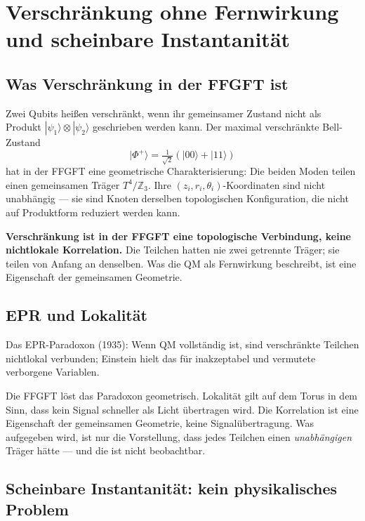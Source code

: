 \chapter{Verschränkung ohne Fernwirkung und scheinbare Instantanität}
\label{ch:verschraenkung}

\section{Was Verschränkung in der FFGFT ist}

Zwei Qubits heißen verschränkt, wenn ihr gemeinsamer Zustand nicht als
Produkt $|\psi_1\rangle\otimes|\psi_2\rangle$ geschrieben werden kann.
Der maximal verschränkte Bell-Zustand
\begin{equation}
  |\Phi^+\rangle = \tfrac{1}{\sqrt2}(|00\rangle+|11\rangle)
\end{equation}
hat in der FFGFT eine geometrische Charakterisierung: Die beiden Moden
teilen einen gemeinsamen Träger $T^4/\mathbb{Z}_3$. Ihre
$(z_i,r_i,\theta_i)$-Koordinaten sind nicht unabhängig --- sie sind
Knoten derselben topologischen Konfiguration, die nicht auf Produktform
reduziert werden kann.

\textbf{Verschränkung ist in der FFGFT eine topologische Verbindung,
keine nichtlokale Korrelation.} Die Teilchen hatten nie zwei getrennte
Träger; sie teilen von Anfang an denselben. Was die QM als Fernwirkung
beschreibt, ist eine Eigenschaft der gemeinsamen Geometrie.

\section{EPR und Lokalität}

Das EPR-Paradoxon (1935): Wenn QM vollständig ist, sind verschränkte
Teilchen nichtlokal verbunden; Einstein hielt das für inakzeptabel und
vermutete verborgene Variablen.

Die FFGFT löst das Paradoxon geometrisch. Lokalität gilt auf dem Torus
in dem Sinn, dass kein Signal schneller als Licht übertragen wird. Die
Korrelation ist eine Eigenschaft der gemeinsamen Geometrie, keine
Signalübertragung. Was aufgegeben wird, ist nur die Vorstellung, dass
jedes Teilchen einen \emph{unabhängigen} Träger hätte --- und die ist
nicht beobachtbar.

\section{Scheinbare Instantanität: kein physikalisches Problem}

